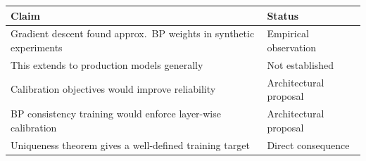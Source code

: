 \begin{center}
\begin{tabular}{ll}
\toprule
Claim & Status \\
\midrule
Gradient descent found approx.\ BP weights in synthetic experiments & Empirical observation \\
This extends to production models generally & Not established \\
Calibration objectives would improve reliability & Architectural proposal \\
BP consistency training would enforce layer-wise calibration & Architectural proposal \\
Uniqueness theorem gives a well-defined training target & Direct consequence \\
\bottomrule
\end{tabular}
\end{center}